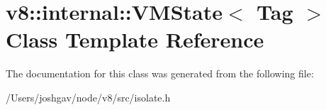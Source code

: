 \hypertarget{classv8_1_1internal_1_1_v_m_state}{}\section{v8\+:\+:internal\+:\+:V\+M\+State$<$ Tag $>$ Class Template Reference}
\label{classv8_1_1internal_1_1_v_m_state}


The documentation for this class was generated from the following file\+:\begin{DoxyCompactItemize}
\item 
/\+Users/joshgav/node/v8/src/isolate.\+h\end{DoxyCompactItemize}
